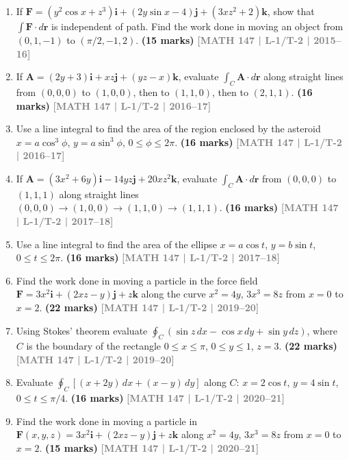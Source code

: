 \documentclass[12pt,a4paper]{article}
\newcommand{\yr}[1]{\hfill\textcolor{gray}{\small\textbf{[#1]}}}
\newcommand{\mk}[1]{\textcolor{orange!70!black}{\small\textbf{(#1 marks)}}}
\begin{document}
\begin{enumerate}

\item If $\mathbf{F}=(y^{2}\cos x+z^{3})\mathbf{i}+(2y\sin x-4)\mathbf{j}+(3xz^{2}+2)\mathbf{k}$, show that $\int\mathbf{F}\cdot d\mathbf{r}$ is independent of path. Find the work done in moving an object from $(0,1,-1)$ to $(\pi/2,-1,2)$.
\mk{15} \yr{MATH 147 | L-1/T-2 | 2015--16}

\item If $\mathbf{A}=(2y+3)\mathbf{i}+xz\mathbf{j}+(yz-x)\mathbf{k}$, evaluate $\int_{C}\mathbf{A}\cdot d\mathbf{r}$ along straight lines from $(0,0,0)$ to $(1,0,0)$, then to $(1,1,0)$, then to $(2,1,1)$.
\mk{16} \yr{MATH 147 | L-1/T-2 | 2016--17}

\item Use a line integral to find the area of the region enclosed by the asteroid $x=a\cos^{3}\phi$, $y=a\sin^{3}\phi$, $0\le\phi\le 2\pi$.
\mk{16} \yr{MATH 147 | L-1/T-2 | 2016--17}

\item If $\mathbf{A}=(3x^{2}+6y)\mathbf{i}-14yz\mathbf{j}+20xz^{2}\mathbf{k}$, evaluate $\int_{C}\mathbf{A}\cdot d\mathbf{r}$ from $(0,0,0)$ to $(1,1,1)$ along straight lines $(0,0,0)\to(1,0,0)\to(1,1,0)\to(1,1,1)$.
\mk{16} \yr{MATH 147 | L-1/T-2 | 2017--18}

\item Use a line integral to find the area of the ellipse $x=a\cos t$, $y=b\sin t$, $0\le t\le 2\pi$.
\mk{16} \yr{MATH 147 | L-1/T-2 | 2017--18}

\item Find the work done in moving a particle in the force field $\mathbf{F}=3x^{2}\mathbf{i}+(2xz-y)\mathbf{j}+z\mathbf{k}$ along the curve $x^{2}=4y$, $3x^{3}=8z$ from $x=0$ to $x=2$.
\mk{22} \yr{MATH 147 | L-1/T-2 | 2019--20}

\item Using Stokes' theorem evaluate $\oint_{C}(\sin z\,dx - \cos x\,dy + \sin y\,dz)$, where $C$ is the boundary of the rectangle $0\le x\le\pi$, $0\le y\le 1$, $z=3$.
\mk{22} \yr{MATH 147 | L-1/T-2 | 2019--20}

\item Evaluate $\displaystyle\oint_{C}[(x+2y)\,dx+(x-y)\,dy]$ along $C$: $x=2\cos t$, $y=4\sin t$, $0\le t\le\pi/4$.
\mk{16} \yr{MATH 147 | L-1/T-2 | 2020--21}

\item Find the work done in moving a particle in $\mathbf{F}(x,y,z)=3x^{2}\mathbf{i}+(2xz-y)\mathbf{j}+z\mathbf{k}$ along $x^{2}=4y$, $3x^{3}=8z$ from $x=0$ to $x=2$.
\mk{15} \yr{MATH 147 | L-1/T-2 | 2020--21}


\end{enumerate}
\end{document}
